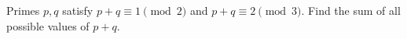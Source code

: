 Primes $p,q$ satisfy $p+q\equiv1\pmod2$ and $p+q\equiv2\pmod3$. Find the sum of all possible values of $p+q$.
